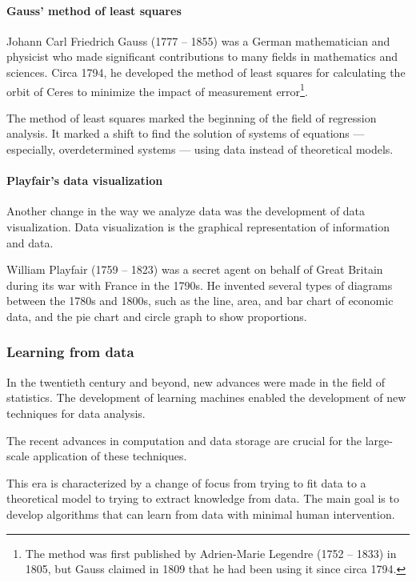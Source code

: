 \paragraph{Gauss' method of least squares}

Johann Carl Friedrich Gauss (1777 -- 1855) was a German mathematician and physicist who made
significant contributions to many fields in mathematics and sciences.  Circa 1794, he
developed the method of least squares for calculating the orbit of Ceres to minimize the
impact of measurement error\footnote{The method was first published by Adrien-Marie
Legendre (1752 -- 1833) in 1805, but Gauss claimed in 1809 that he
had been using it since circa 1794.}.

The method of least squares marked the beginning of the field of regression analysis.  It
marked a shift to find the solution of systems of equations --- especially, overdetermined
systems --- using data instead of theoretical models.

\paragraph{Playfair's data visualization}

Another change in the way we analyze data was the development of data visualization.  Data
visualization is the graphical representation of information and data.

William Playfair (1759 -- 1823) was a secret agent on behalf of Great Britain during its
war with France in the 1790s.  He invented several types of diagrams between the 1780s and
1800s, such as the line, area, and bar chart of economic data, and the pie chart and circle
graph to show proportions.

\subsubsection{Learning from data}

In the twentieth century and beyond, new advances were made in the field of statistics.
The development of learning machines enabled the development of new techniques for data
analysis.

The recent advances in computation and data storage are crucial for the large-scale
application of these techniques.

This era is characterized by a change of focus from trying to fit data to a theoretical
model to trying to extract knowledge from data.  The main goal is to develop algorithms
that can learn from data with minimal human intervention.

